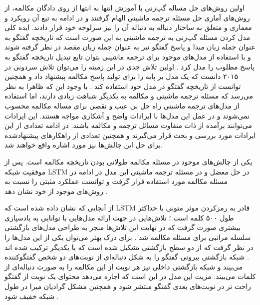 اولین روش‌های حل مساله گپ‌زنی با آموزش انتها به انتها 	از روی دادگان مکالمه، از روش‌های آماری حل مسئله ترجمه ماشینی الهام گرفتند و در ادامه به تبع آن رویکرد و معماری 
و
متعلق به ساختار دنباله به دنباله آن را نیز سرلوحه خود قرار دادند. ایده کلی مدل‌ کردن مسئله گپ‌زنی به ترجمه ماشینی به این صورت است که تاریخچه گفتگو به عنوان جمله زبان مبدا و پاسخ گفتگو نیز به عنوان جمله زبان مقصد در نظر گرفته شوند و با استفاده از مدل‌های موجود برای ترجمه ماشینی بتوان تابع تبدیل تاریخچه گفتگو به پاسخ مطلوب را مدل کرد
\cite{ritter-etal-2011-data}
.
اولین تلاش جدی در این زمینه را می‌‌توان تلاش سردونی در ۲۰۱۵ دانست که یک مدل بر پایه 
را برای تولید پاسخ مکالمه پیشنهاد داد و همچنین توانست از تاریخچه گفتگو در مدل خود استفاده کند
\cite{DBLP:journals/corr/SordoniGABJMNGD15}
.
با وجود این که ظاهرا به نظر می‌رسد که مسئله ترجمه ماشینی و مکالمه به یکدیگر شباهت زیادی دارند، اما استفاده از مدل‌های ترجمه ماشینی راه حل بی عیب و نقصی برای مساله مکالمه محسوب نمی‌شوند و در عمل این مدل‌ها با ایرادات واضح و آشکاری مواجه هستند. این ایرادات می‌توانند برآمده از ذات متفاوت مسائل ترجمه و مکالمه باشند. در ادامه تعدادی از این ایرادات 
مورد بررسی و بحث قرار می‌گیرند و همچنین تعدادی از راهکارهای پیشنهادشده برای حل این چالش‌ها نیز مورد اشاره واقع خواهند شد. 


یکی از چالش‌های موجود در مسئله مکالمه طولانی بودن تاریخچه مکالمه است. پس از موفقیت شبکه LSTM در حل معضل 
و 
در مسئله ترجمه ماشینی این مدل در ادامه در مسئله مکالمه مورد استفاده قرار گرفت و توانست عملکرد مثبتی را نسبت به روش‌های موجود از خود نشان دهد
\cite{A_Neural_Conversational_Model}.

از آنجایی که نشان داده شده است که LSTM قادر به رمزکردن موثر متونی با حداکثر طول ۵۰۰ کلمه است
\cite{DBLP:journals/corr/abs-1805-04623}
؛
تلاش‌هایی در جهت ارائه مدل‌هایی با توانایی به یادسپاری بیشتری صورت گرفت که در نهایت این تلاش‌ها منجر به طراحی مدل‌های بازگشتی سلسله مراتبی برای مسئله مکالمه شد
\cite{DBLP:journals/corr/SerbanSBCP15, DBLP:journals/corr/XingWWZHM17, DBLP:journals/corr/SordoniBVLSN15}.
برای درک بهتر می‌توان یکی از این مدل‌ها را در نظر گرفت که از دو سطح بازگشتی تشکیل شده است که با یکدیگر ترکیب شده اند
\cite{DBLP:journals/corr/SordoniBVLSN15}.
شبکه بازگشتی بیرونی گفتگو را به شکل دنباله‌ای از نوبت‌های دو شخص گفتگوکننده می‌بیند و شبکه بازگشتی داخلی نیز هر نوبت از این مکالمه را به صورت دنباله‌ای از کلمات می‌بیند. مزیت این مدل در این است که اجازه می‌دهد محتوای یک نوبت از گفتگو راحت تر در نوبت‌های بعدی گفتگو منتشر شود و همچنین مشکل گرادیان میرا در طول شبکه خفیف شود
\cite{Gao_Neural_Approaches}.

